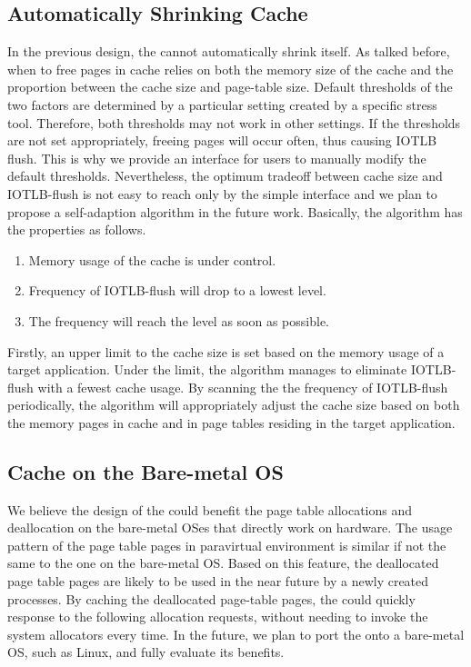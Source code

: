\subsection{Automatically Shrinking \name Cache}
In the previous design, the \cache cannot automatically shrink itself.
As talked before, when to free pages in cache relies on both the memory size of the cache and the proportion between the cache size and page-table size. Default thresholds of the two factors are determined by a particular setting created by a specific stress tool. Therefore, both thresholds may not work in other settings. If the thresholds are not set appropriately, freeing pages will occur often, thus causing IOTLB flush. This is why we provide an interface for users to manually modify the default thresholds. Nevertheless, the optimum tradeoff between cache size and IOTLB-flush is not easy to reach only by the simple interface and we plan to propose a self-adaption algorithm in the future work. Basically, the algorithm has the properties as follows.
\begin{enumerate}
\item Memory usage of the cache is under control.
\item Frequency of IOTLB-flush will drop to a lowest level.
\item The frequency will reach the level as soon as possible.
\end{enumerate}

Firstly, an upper limit to the cache size is set based on the memory usage of a target application. Under the limit, the algorithm manages to eliminate IOTLB-flush with a fewest cache usage. By scanning the the frequency of IOTLB-flush periodically, the algorithm will appropriately adjust the cache size based on both the memory pages in cache and in page tables residing in the target application.



\subsection{\name Cache on the Bare-metal OS}
We believe the design of the \cache could benefit the page table allocations and deallocation on the bare-metal OSes that directly work on hardware.
The usage pattern of the page table pages in paravirtual environment is similar if not the same to the one on the bare-metal OS.
Based on this feature, the deallocated page table pages are likely to be used in the near future by a newly created processes.
By caching the deallocated page-table pages, the \cache could quickly response to the following allocation requests, without needing to invoke the system allocators every time.
In the future, we plan to port the \cache onto a bare-metal OS, such as Linux, and fully evaluate its benefits.
